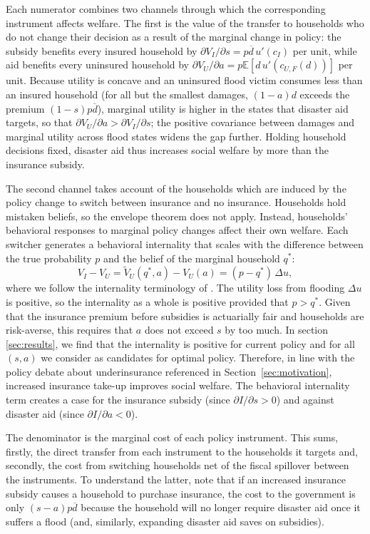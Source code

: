 \documentclass[12pt]{article}
\begin{document}
Each numerator combines two channels through which the corresponding instrument affects welfare. The first is the value of the transfer to households who do not change their decision as a result of the marginal change in policy: the subsidy benefits every insured household by $\partial V_I/\partial s = p\overline{d}\,u'(c_I)$ per unit, while aid benefits every uninsured household by $\partial V_U/\partial a = p\mathbb{E}[d\,u'(c_{U,F}(d))]$ per unit. Because utility is concave and an uninsured flood victim consumes less than an insured household (for all but the smallest damages, $(1-a)d$ exceeds the premium $(1-s)p\overline{d}$), marginal utility is higher in the states that disaster aid targets, so that $\partial V_U/\partial a > \partial V_I/\partial s$; the positive covariance between damages and marginal utility across flood states widens the gap further. Holding household decisions fixed, disaster aid thus increases social welfare by more than the insurance subsidy. 

The second channel takes account of the households which are induced by the policy change to switch between insurance and no insurance. Households hold mistaken beliefs, so the envelope theorem does not apply. Instead, households' behavioral responses to marginal policy changes affect their own welfare. Each switcher generates a behavioral internality that scales with the difference between the true probability $p$ and the belief of the marginal household $q^*$:
\begin{equation}
    V_I - V_U = \tilde{V}_U(q^*,a) - V_U(a) = (p-q^*)\,\Delta u, \label{eq:internality_prog}
\end{equation}
where we follow the internality terminology of \cite{allcott2019regressive}. The utility loss from flooding $\Delta u$ is positive, so the internality as a whole is positive provided that $p>q^*$. Given that the insurance premium before subsidies is actuarially fair and households are risk-averse, this requires that $a$ does not exceed $s$ by too much. In section \ref{sec:results}, we find that the internality is positive for current policy and for all $(s,a)$ we consider as candidates for optimal policy. Therefore, in line with the policy debate about underinsurance referenced in Section~\ref{sec:motivation}, increased insurance take-up improves social welfare. The behavioral internality term creates a case for the insurance subsidy (since $\partial I/\partial s>0$) and against disaster aid (since $\partial I/\partial a<0$).   

The denominator is the marginal cost of each policy instrument. This sums, firstly, the direct transfer from each instrument to the households it targets and, secondly, the cost from switching households net of the fiscal spillover between the instruments. To understand the latter, note that if an increased insurance subsidy causes a household to purchase insurance, the cost to the government is only $(s-a)p\overline{d}$ because the household will no longer require disaster aid once it suffers a flood (and, similarly, expanding disaster aid saves on subsidies).    
\end{document}
